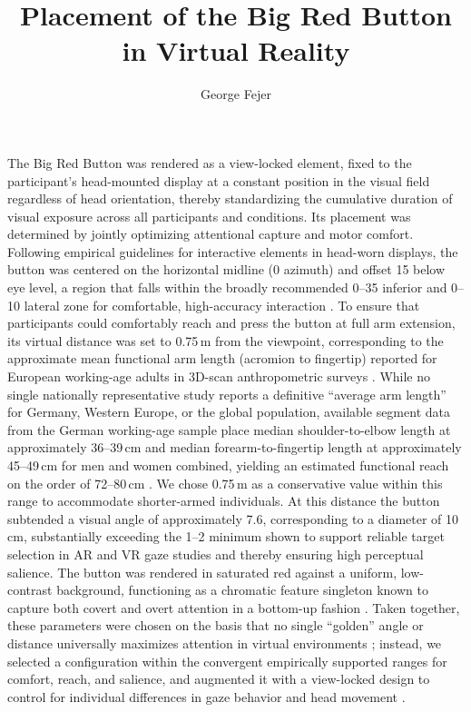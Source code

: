 \documentclass[12pt, a4paper]{article}
\title{Placement of the Big Red Button in Virtual Reality}
\author{George Fejer}
\date{}
\begin{document}
\maketitle

The Big Red Button was rendered as a view-locked element, fixed to the participant's head-mounted display at a constant position in the visual field regardless of head orientation, thereby standardizing the cumulative duration of visual exposure across all participants and conditions.
Its placement was determined by jointly optimizing attentional capture and motor comfort.
Following empirical guidelines for interactive elements in head-worn displays, the button was centered on the horizontal midline (0\textdegree{} azimuth) and offset 15\textdegree{} below eye level, a region that falls within the broadly recommended 0--35\textdegree{} inferior and 0--10\textdegree{} lateral zone for comfortable, high-accuracy interaction \citep{Lin2021, Mirbagheri2024}.
To ensure that participants could comfortably reach and press the button at full arm extension, its virtual distance was set to 0.75\,m from the viewpoint, corresponding to the approximate mean functional arm length (acromion to fingertip) reported for European working-age adults in 3D-scan anthropometric surveys \citep{Bonin2022}.
While no single nationally representative study reports a definitive ``average arm length'' for Germany, Western Europe, or the global population, available segment data from the German working-age sample place median shoulder-to-elbow length at approximately 36--39\,cm and median forearm-to-fingertip length at approximately 45--49\,cm for men and women combined, yielding an estimated functional reach on the order of 72--80\,cm \citep{Bonin2022, Stolzenberg2007, Minetto2022}.
We chose 0.75\,m as a conservative value within this range to accommodate shorter-armed individuals.
At this distance the button subtended a visual angle of approximately 7.6\textdegree{}, corresponding to a diameter of 10\,cm, substantially exceeding the 1--2\textdegree{} minimum shown to support reliable target selection in AR and VR gaze studies \citep{Mirbagheri2024, Castellana2025} and thereby ensuring high perceptual salience.
The button was rendered in saturated red against a uniform, low-contrast background, functioning as a chromatic feature singleton known to capture both covert and overt attention in a bottom-up fashion \citep{Xi2025, Castellotti2022, Li2008}.
Taken together, these parameters were chosen on the basis that no single ``golden'' angle or distance universally maximizes attention in virtual environments \citep{Luck2020, Haas2018}; instead, we selected a configuration within the convergent empirically supported ranges for comfort, reach, and salience, and augmented it with a view-locked design to control for individual differences in gaze behavior and head movement \citep{Alghofaili2019, McNamara2019}.


\end{document}
